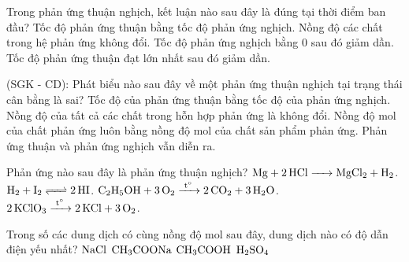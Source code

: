 \documentclass[12pt,a4paper]{article}
\begin{document}
\begin{ex}
Trong phản ứng thuận nghịch, kết luận nào sau đây là đúng tại thời điểm ban đầu?
\choice
{Tốc độ phản ứng thuận bằng tốc độ phản ứng nghịch.}
{Nồng độ các chất trong hệ phản ứng không đổi.}
{Tốc độ phản ứng nghịch bằng 0 sau đó giảm dần.}
{\True Tốc độ phản ứng thuận đạt lớn nhất sau đó giảm dần.}
\end{ex}

\begin{ex}
(SGK - CD): Phát biểu nào sau đây về một phản ứng thuận nghịch tại trạng thái cân bằng là sai?
\choice
{Tốc độ của phản ứng thuận bằng tốc độ của phản ứng nghịch.}
{Nồng độ của tất cả các chất trong hỗn hợp phản ứng là không đổi.}
{\True Nồng độ mol của chất phản ứng luôn bằng nồng độ mol của chất sản phẩm phản ứng.}
{Phản ứng thuận và phản ứng nghịch vẫn diễn ra.}
\end{ex}

\begin{ex}
Phản ứng nào sau đây là phản ứng thuận nghịch?
\choice
{$\ce{Mg + 2HCl -> MgCl2 + H2}$.}
{\True $\ce{H2 + I2 <=> 2HI}$.}
{$\ce{C2H5OH + 3O2 ->[t^\circ] 2CO2 + 3H2O}$.}
{$\ce{2KClO3 ->[t^\circ] 2KCl + 3O2}$.}
\end{ex}

\begin{ex}
Trong số các dung dịch có cùng nồng độ mol sau đây, dung dịch nào có độ dẫn điện yếu nhất?
\choice
{$\ce{NaCl}$}
{$\ce{CH3COONa}$}
{\True $\ce{CH3COOH}$}
{$\ce{H2SO4}$}
\end{ex}
\end{document}
